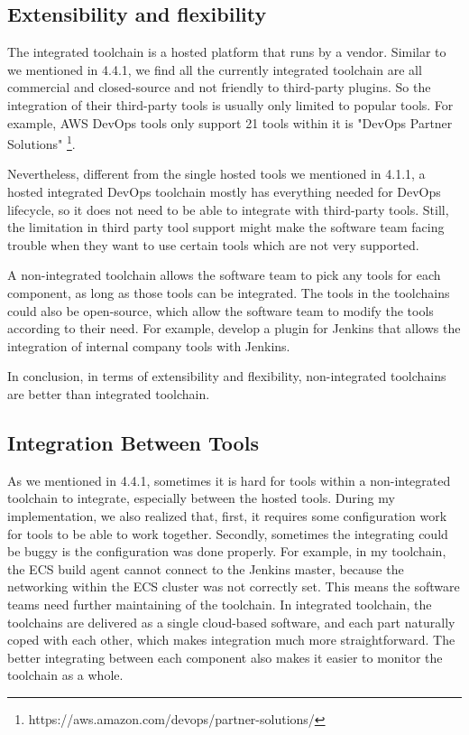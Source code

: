 \subsection{Extensibility and flexibility}
The integrated toolchain is a hosted platform that runs by a vendor. Similar to we mentioned in 4.4.1, we find all the currently integrated toolchain are all commercial and closed-source and not friendly to third-party plugins. So the integration of their third-party tools is usually only limited to popular tools. For example, AWS DevOps tools only support 21 tools within it is "DevOps Partner Solutions" \footnote{https://aws.amazon.com/devops/partner-solutions/}.
\par
Nevertheless, different from the single hosted tools we mentioned in 4.1.1, a hosted integrated DevOps toolchain mostly has everything needed for DevOps lifecycle, so it does not need to be able to integrate with third-party tools. Still, the limitation in third party tool support might make the software team facing trouble when they want to use certain tools which are not very supported.
\par
A non-integrated toolchain allows the software team to pick any tools for each component, as long as those tools can be integrated. The tools in the toolchains could also be open-source, which allow the software team to modify the tools according to their need. For example, develop a plugin for Jenkins that allows the integration of internal company tools with Jenkins.
\par
In conclusion, in terms of extensibility and flexibility, non-integrated toolchains are better than integrated toolchain.
\subsection{Integration Between Tools}
As we mentioned in 4.4.1, sometimes it is hard for tools within a non-integrated toolchain to integrate, especially between the hosted tools. 
During my implementation, we also realized that, first, it requires some configuration work for tools to be able to work together. Secondly, sometimes the integrating could be buggy is the configuration was done properly. For example, in my toolchain, the ECS build agent cannot connect to the Jenkins master, because the networking within the ECS cluster was not correctly set. This means the software teams need further maintaining of the toolchain.
In integrated toolchain, the toolchains are delivered as a single cloud-based software, and each part naturally coped with each other, which makes integration much more straightforward.
The better integrating between each component also makes it easier to monitor the toolchain as a whole.
